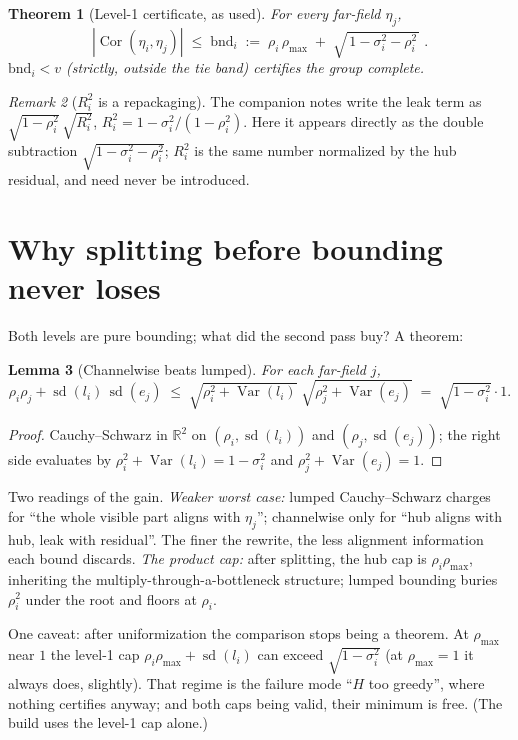 \documentclass[11pt]{article}
\newtheorem{theorem}{Theorem}[section]
\newtheorem{lemma}[theorem]{Lemma}
\theoremstyle{remark}
\newtheorem{remark}[theorem]{Remark}
\newcommand{\Var}{\operatorname{Var}}
\newcommand{\Cor}{\operatorname{Cor}}
\newcommand{\sd}{\operatorname{sd}}
\begin{document}
\begin{theorem}[Level-1 certificate, as used]\label{thm:lvl1}
For every far-field $\eta_j$,
\[
  |\Cor(\eta_i,\eta_j)|
  \;\le\;
  \mathrm{bnd}_i
  \;:=\;
  \rho_i\,\rho_{\max}
  \;+\;
  \sqrt{\,1 - \sigma_i^2 - \rho_i^2\,}\;.
\]
$\mathrm{bnd}_i < v$ (strictly, outside the tie band) certifies the
group complete.
\end{theorem}

\begin{remark}[$R_i^2$ is a repackaging]
The companion notes write the leak term as
$\sqrt{1-\rho_i^2}\,\sqrt{R_i^2}$,
$R_i^2 = 1 - \sigma_i^2/(1-\rho_i^2)$.  Here it appears directly as the
double subtraction $\sqrt{1 - \sigma_i^2 - \rho_i^2}$; $R_i^2$ is the
same number normalized by the hub residual, and need never be
introduced.
\end{remark}

\section{Why splitting before bounding never loses}\label{sec:split}

Both levels are pure bounding; what did the second pass buy?  A
theorem:

\begin{lemma}[Channelwise beats lumped]\label{lem:split}
For each far-field $j$,
\[
  \rho_i\rho_j + \sd(l_i)\,\sd(e_j)
  \;\le\;
  \sqrt{\rho_i^2 + \Var(l_i)}\;\sqrt{\rho_j^2 + \Var(e_j)}
  \;=\; \sqrt{1-\sigma_i^2}\cdot 1 .
\]
\end{lemma}

\begin{proof}
Cauchy--Schwarz in $\mathbb R^2$ on $(\rho_i, \sd(l_i))$ and
$(\rho_j, \sd(e_j))$; the right side evaluates by
$\rho_i^2 + \Var(l_i) = 1 - \sigma_i^2$ and
$\rho_j^2 + \Var(e_j) = 1$.
\end{proof}

Two readings of the gain.  \emph{Weaker worst case:} lumped
Cauchy--Schwarz charges for ``the whole visible part aligns with
$\eta_j$''; channelwise only for ``hub aligns with hub, leak with
residual''.  The finer the rewrite, the less alignment information each
bound discards.  \emph{The product cap:} after splitting, the hub cap
is $\rho_i\rho_{\max}$, inheriting the multiply-through-a-bottleneck
structure; lumped bounding buries $\rho_i^2$ under the root and floors
at $\rho_i$.

One caveat: after uniformization the comparison stops being a theorem.
At $\rho_{\max}$ near $1$ the level-1 cap
$\rho_i\rho_{\max} + \sd(l_i)$ can exceed $\sqrt{1-\sigma_i^2}$ (at
$\rho_{\max}=1$ it always does, slightly).  That regime is the failure
mode ``$H$ too greedy'', where nothing certifies anyway; and both caps
being valid, their minimum is free.  (The build uses the level-1 cap
alone.)
\end{document}

